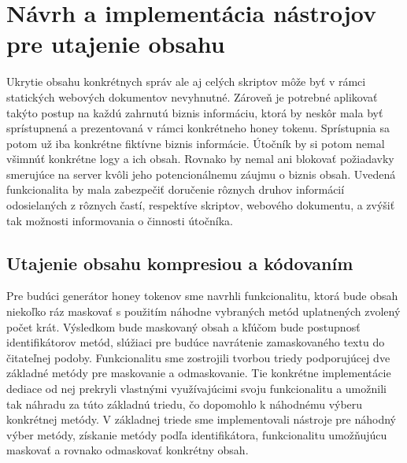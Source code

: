 \documentclass[conference, 11pt,slovak,a4paper,twoside]{IEEEtran}
\begin{document}
\section{Návrh a implementácia nástrojov pre utajenie obsahu}

Ukrytie obsahu konkrétnych správ ale aj celých skriptov môže byť v rámci statických webových dokumentov nevyhnutné. Zároveň je potrebné aplikovať takýto postup na každú zahrnutú biznis informáciu, ktorá by neskôr mala byť sprístupnená a prezentovaná v rámci konkrétneho honey tokenu. Sprístupnia sa potom už iba konkrétne fiktívne biznis informácie. Útočník by si potom nemal všimnúť konkrétne logy a ich obsah. Rovnako by nemal ani blokovať požiadavky smerujúce na server kvôli jeho potencionálnemu záujmu o biznis obsah. Uvedená funkcionalita by mala zabezpečiť doručenie rôznych druhov informácií odosielaných z rôznych častí, respektíve skriptov, webového dokumentu, a zvýšiť tak možnosti informovania o činnosti útočníka.


\subsection{Utajenie obsahu kompresiou a kódovaním}

Pre budúci generátor honey tokenov sme navrhli funkcionalitu, ktorá bude obsah niekoľko ráz maskovať s použitím náhodne vybraných metód uplatnených zvolený počet krát. Výsledkom bude maskovaný obsah a kľúčom bude postupnosť identifikátorov metód, slúžiaci pre budúce navrátenie zamaskovaného textu do čitateľnej podoby. Funkcionalitu sme zostrojili tvorbou triedy podporujúcej dve základné metódy pre maskovanie a odmaskovanie. Tie konkrétne implementácie dediace od nej prekryli vlastnými využívajúcimi svoju funkcionalitu a umožnili tak náhradu za túto základnú triedu, čo dopomohlo k náhodnému výberu konkrétnej metódy. V základnej triede sme implementovali nástroje pre náhodný výber metódy, získanie metódy podľa identifikátora, funkcionalitu umožňujúcu maskovať a rovnako odmaskovať konkrétny obsah.
\end{document}
